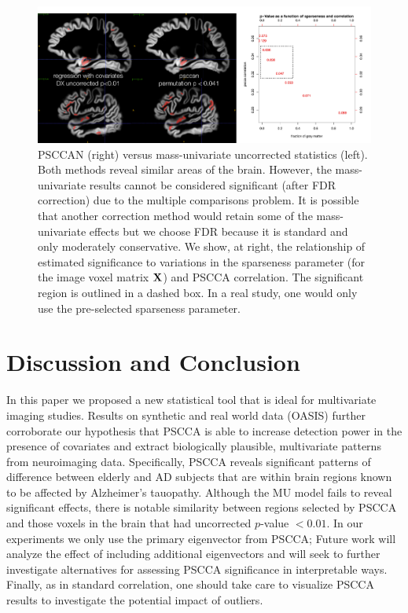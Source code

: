 \documentclass{llncs}
\newcommand{\X}{{\bf X}}
\newcommand{\Y}{{\bf Y}}
\begin{document}
\begin{figure}
\begin{center}
\includegraphics[width=120mm]{MUvPSCCAN.pdf} 
\end{center}
\vspace{-0.1in}
\caption{PSCCAN (right) versus mass-univariate uncorrected statistics
(left).  Both methods reveal similar areas of the brain.  However, the
mass-univariate results cannot be considered significant (after FDR
correction) due to the multiple comparisons problem.  It is possible
that another correction method would retain some of the mass-univariate
effects but we choose FDR because it is standard and only moderately
conservative.  We show, at right, the relationship of estimated
significance to variations in the sparseness parameter (for the image
voxel matrix $\X$) and PSCCA correlation.  The significant region is
outlined in a dashed box.  In a real study, one would only use the
pre-selected sparseness parameter.}
\label{fig:comp}
\end{figure}
\section{Discussion and Conclusion}
In this paper we proposed a new statistical tool that is
ideal for multivariate imaging studies. 
Results on synthetic and
real world data (OASIS) further corroborate our hypothesis that PSCCA
is able to increase detection power in the presence of covariates and
extract biologically plausible, multivariate patterns from neuroimaging
data.  Specifically, PSCCA reveals significant patterns of difference
between elderly and AD subjects that are within brain regions known to
be affected by Alzheimer's tauopathy.  Although the MU model fails to reveal
significant effects, there is notable similarity between regions selected by PSCCA and
those voxels in the brain that had uncorrected $p$-value $< 0.01$.  %
In our experiments we only use the
primary eigenvector from PSCCA;
Future work will analyze the effect of including additional
eigenvectors and will seek to further investigate alternatives for
assessing PSCCA significance in interpretable ways. Finally, as in standard correlation, one should take care to visualize PSCCA results to investigate the potential impact of outliers. 
\end{document}
